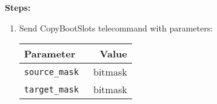 \textbf{Steps:}
\begin{enumerate}
	\item Send CopyBootSlots telecommand with parameters:
	
		\begin{tabular}{l|r}
			Parameter & Value \\
			\hline
			\texttt{source\_mask} & \targetbs{} bitmask \\ 
			\texttt{target\_mask } & \currentbs{} bitmask
		\end{tabular}
\end{enumerate}


\let\currentbs\undefined
\let\targetbs\undefined